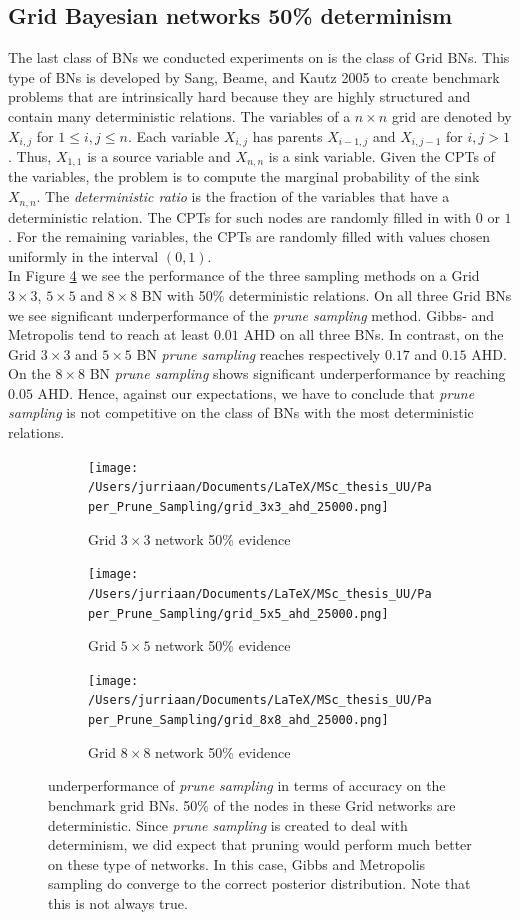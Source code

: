 \documentclass[a4paper, twoside, 11pt]{report}
\theoremstyle{plain}
\theoremstyle{definition}
\theoremstyle{remark}
\newcommand{\ps}{\textit{prune sampling }}
\begin{document}
\subsection{Grid Bayesian networks 50\% determinism}
The last class of BNs we conducted experiments on is the class of Grid BNs. This type of BNs is developed by Sang, Beame, and Kautz 2005 \cite{sang2005solving} to create benchmark problems that are intrinsically hard because they are highly structured and contain many deterministic relations. The variables of a $n \times n$ grid are denoted by $X_{i,j}$ for $1 \leq i,j \leq n$. Each variable $X_{i,j}$ has parents $X_{i-1,j}$ and $X_{i,j-1}$ for $i,j>1$. Thus, $X_{1,1}$ is a source variable and $X_{n,n}$ is a sink variable. Given the CPTs of the variables, the problem is to compute the marginal probability of the sink $X_{n,n}$. The \textit{deterministic ratio} is the fraction of the variables that have a deterministic relation. The CPTs for such nodes are randomly filled in with $0$ or $1$. For the remaining variables, the CPTs are randomly filled with values chosen uniformly in the interval $(0, 1)$.\\

In Figure \ref{results3} we see the performance of the three sampling methods on a Grid $3 \times 3$, $5 \times 5$ and $8 \times 8$ BN with 50\% deterministic relations. On all three Grid BNs we see significant underperformance of the \ps method. Gibbs- and Metropolis tend to reach at least $0.01$ AHD on all three BNs. In contrast, on the Grid $3 \times 3$ and $5 \times 5$ BN \ps reaches respectively $0.17$ and $0.15$ AHD. On the $8 \times 8$ BN \ps shows significant underperformance by reaching $0.05$ AHD. Hence, against our expectations, we have to conclude that \ps is not competitive on the class of BNs with the most deterministic relations.
\begin{figure}[H]
\centering
\begin{subfigure}{0.49\textwidth}
\texttt{[image: /Users/jurriaan/Documents/LaTeX/MSc\_thesis\_UU/Paper\_Prune\_Sampling/grid\_3x3\_ahd\_25000.png]}
\caption{Grid $3 \times 3$ network 50\% evidence}%
\label{grid_3x3}%
\end{subfigure}\hfill%
\begin{subfigure}{0.49\textwidth}
\texttt{[image: /Users/jurriaan/Documents/LaTeX/MSc\_thesis\_UU/Paper\_Prune\_Sampling/grid\_5x5\_ahd\_25000.png]}
\caption{Grid $5 \times 5$ network 50\% evidence}%
\label{grid_5x5}%
\end{subfigure}
\begin{subfigure}{0.49\textwidth}
\texttt{[image: /Users/jurriaan/Documents/LaTeX/MSc\_thesis\_UU/Paper\_Prune\_Sampling/grid\_8x8\_ahd\_25000.png]}
\caption{Grid $8 \times 8$ network 50\% evidence}%
\label{grid_8x8}%
\end{subfigure}\hfill%
\caption{underperformance of \ps in terms of accuracy on the benchmark grid BNs. 50\% of the nodes in these Grid networks are deterministic. Since \ps is created to deal with determinism, we did expect that pruning would perform much better on these type of networks. In this case, Gibbs and Metropolis sampling do converge to the correct posterior distribution. Note that this is not always true.}
\label{results3}
\end{figure}
\end{document}
